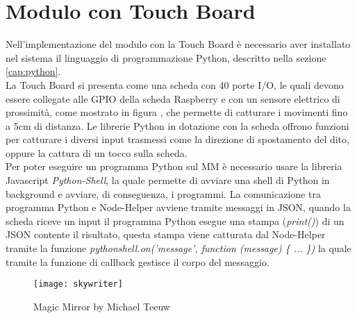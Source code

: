 \section{Modulo con Touch Board}
Nell'implementazione del modulo con la Touch Board è necessario aver installato nel sistema
il linguaggio di programmazione Python, descritto nella sezione \ref{cap:python}.\\
La Touch Board si presenta come una scheda con 40 porte I/O, le quali devono essere collegate alle
GPIO della scheda Raspberry e con un sensore elettrico di prossimità, come mostrato in figura , che permette di catturare i movimenti fino a 5cm di distanza.
Le librerie Python in dotazione con la scheda offrono funzioni per catturare i diversi input trasmessi come
la direzione di spostamento del dito, oppure la cattura di un tocco sulla scheda.\\
Per poter eseguire un programma Python sul MM è necessario usare la libreria Javascript \emph{Python-Shell}, la quale
permette di avviare una shell di Python in background e avviare, di conseguenza, i programmi.
La comunicazione tra programma Python e Node-Helper avviene tramite messaggi in JSON, quando la scheda riceve un input
il programma Python esegue una stampa (\emph{print()}) di un JSON contente il risultato, questa stampa viene catturata dal
Node-Helper tramite la funzione \emph{pythonshell.on('message', function (message) \{ ... \})} la quale tramite la funzione di callback
gestisce il corpo del messaggio.

\begin{figure}[H]
    \texttt{[image: skywriter]}
    \caption{Magic Mirror by Michael Teeuw}
    \label{fig:TouchBoard}
\end{figure}

